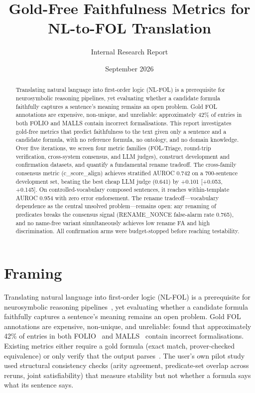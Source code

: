 \documentclass[11pt,letterpaper]{article}
\title{Gold-Free Faithfulness Metrics for NL-to-FOL Translation}
\author{Internal Research Report}
\date{September 2026}
\begin{document}
\maketitle

\begin{abstract}
Translating natural language into first-order logic (NL-FOL) is a prerequisite for neurosymbolic reasoning pipelines, yet evaluating whether a candidate formula faithfully captures a sentence's meaning remains an open problem. Gold FOL annotations are expensive, non-unique, and unreliable: approximately 42\% of entries in both FOLIO and MALLS contain incorrect formalisations. This report investigates gold-free metrics that predict faithfulness to the text given only a sentence and a candidate formula, with no reference formula, no ontology, and no domain knowledge. Over five iterations, we screen four metric families (FOL-Triage, round-trip verification, cross-system consensus, and LLM judges), construct development and confirmation datasets, and quantify a fundamental rename tradeoff. The cross-family consensus metric (c\_score\_align) achieves stratified AUROC 0.742 on a 700-sentence development set, beating the best cheap LLM judge (0.641) by +0.101 [+0.053, +0.145]. On controlled-vocabulary composed sentences, it reaches within-template AUROC 0.954 with zero error endorsement. The rename tradeoff---vocabulary dependence as the central unsolved problem---remains open: any renaming of predicates breaks the consensus signal (RENAME\_NONCE false-alarm rate 0.765), and no name-free variant simultaneously achieves low rename FA and high discrimination. All confirmation arms were budget-stopped before reaching testability.
\end{abstract}

\tableofcontents
\newpage

\section{Framing}

Translating natural language into first-order logic (NL-FOL) is a prerequisite for neurosymbolic reasoning pipelines~\citep{Pan2023}, yet evaluating whether a candidate formula faithfully captures a sentence's meaning remains an open problem. Gold FOL annotations are expensive, non-unique, and unreliable: \citet{Brunello2026} found that approximately 42\% of entries in both FOLIO~\citep{Han2022} and MALLS~\citep{Yang2023malls} contain incorrect formalisations. Existing metrics either require a gold formula (exact match, prover-checked equivalence) or only verify that the output parses~\citep{Thatikonda2025, Thatikonda2024}. The user's own pilot study used structural consistency checks (arity agreement, predicate-set overlap across reruns, joint satisfiability) that measure stability but not whether a formula says what its sentence says.
\end{document}
